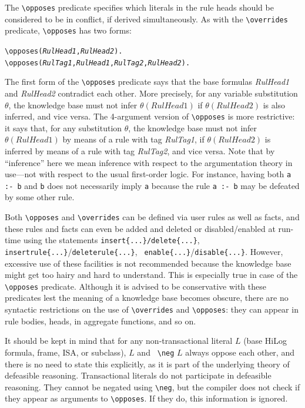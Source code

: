 \documentclass[11pt]{article}
\newcommand{\bs}{\textbackslash}
\newcommand{\RULELOGNEG}{{\texttt{{\bs}neg}}\xspace}
\begin{document}
The {\tt \bs{}opposes} predicate specifies which literals in the rule heads
should be considered to be in conflict, if derived simultaneously. As with the
{\tt \bs{}overrides} predicate, {\tt \bs{}opposes} has two forms:
\index{\bs{}opposes predicate}
\begin{alltt}
  \bs{}opposes({\em{}RulHead1},\emph{RulHead2}).
  \bs{}opposes({\em{}RulTag1},{\em{}RulHead1},{\em{}RulTag2},\emph{RulHead2}).
\end{alltt}
The first form of the {\tt \bs{}opposes} predicate says that the base
formulas \emph{RulHead1} and \emph{RulHead2} contradict each other.  More
precisely, for any variable substitution $\theta$, the knowledge
base must not infer $\theta(RulHead1)$ if $\theta(RulHead2)$ is also
inferred, and vice versa.  The 4-argument version of {\tt \bs{}opposes} is
more restrictive: it says that, for any substitution $\theta$, the
knowledge base must not infer $\theta(RulHead1)$ by means of a rule with
tag \emph{RulTag1}, if $\theta(RulHead2)$ is inferred by means of a
rule with tag \emph{RulTag2}, and vice versa.
Note that by ``inference'' here we mean inference with respect to the
argumentation theory in use---not 
with respect to the usual first-order logic. For instance, having both
{\tt a :- b} and
{\tt b} does not necessarily imply {\tt a} because the rule {\tt a :-
  b} may be defeated by some other rule.      

Both {\tt \bs{}opposes} and {\tt \bs{}overrides} can be defined via user rules
as well as facts, and these rules and facts can even be added and deleted
or disabled/enabled
at run-time using the statements {\tt insert\{...\}/delete\{...\}}, {\tt
  insertrule\{...\}}/{\tt deleterule\{...\}}, {\tt
  enable\{...\}}/{\tt disable\{...\}}.
However, excessive use of these facilities
is not recommended because the
knowledge base might get too hairy and
hard to understand. This is especially true in case of
the {\tt \bs{}opposes} predicate.  Although it is advised
to be conservative with these predicates lest the meaning of a knowledge
base becomes obscure, there are no syntactic restrictions on the use of
{\tt \bs{}overrides} and {\tt \bs{}opposes}: they can appear in rule bodies,
heads, in aggregate functions, and so on.  

It should be kept in mind that for any non-transactional literal $L$
(base HiLog formula, frame, ISA, or subclass), $L$ and {\tt
  \RULELOGNEG} $L$ always oppose each other, and there is no need to state this
explicitly, as it is part of the underlying theory of defeasible reasoning.
Transactional literals do not participate in defeasible reasoning.
They cannot be negated using {\tt \RULELOGNEG}, but the compiler does not check if
they appear as arguments to {\tt \bs{}opposes}. If they do, this information
is ignored.
\end{document}
